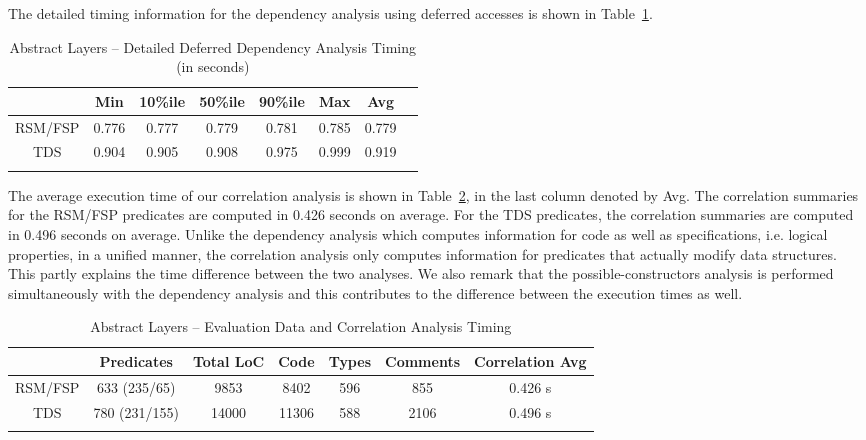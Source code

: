 \documentclass[11pt]{article}
\begin{document}
The detailed timing information for the dependency analysis using deferred accesses
is shown in Table~\ref{res:statsdef2}.

\begin{table}[hbtp]
\caption[Abstract Layers -- Detailed Deferred Dependency Analysis Timing]
{Abstract Layers -- Detailed Deferred Dependency Analysis Timing (in seconds)}
\centering
\begin{tabular}{cccccccc} \toprule
    {}  & {Min} & {10\%ile} & {50\%ile} & {90\%ile} & {Max} & {Avg} \\ \midrule
RSM/FSP & 0.776 & 0.777     & 0.779     & 0.781     & 0.785 & 0.779 \\ \midrule
TDS     & 0.904 & 0.905     & 0.908     & 0.975     & 0.999 & 0.919 \\ \bottomrule\\
\end{tabular}
\label{res:statsdef2}
\end{table}

The average execution time of our correlation
analysis is shown in Table~\ref{res:statscor1}, in the last column denoted by
Avg. The correlation summaries for the RSM/FSP predicates are computed in
0.426 seconds on average. For the TDS predicates, the correlation summaries are
computed in 0.496 seconds on average.
Unlike the dependency analysis which computes information for code as well as
specifications, i.e. logical properties, in a unified manner, the correlation analysis
only computes information for predicates that actually modify data structures.
This partly explains the time difference between the two analyses. We also remark that
the possible-constructors analysis is performed simultaneously with the dependency 
analysis and this contributes to the difference between the execution times as well. 

\begin{table}[hbtp]
\caption{Abstract Layers -- Evaluation Data and Correlation Analysis Timing}
\centering
\begin{tabular}{@{}cc@{\hspace{0.5\tabcolsep}}ccccc@{}} \toprule
    {}      & {Predicates}  & {Total LoC} & {Code} & {Types} & {Comments} & {Correlation Avg}  
                                                                                    \\ \midrule
    RSM/FSP & 633 (235/65)  & 9853        & 8402   & 596     & 855        & 0.426 s \\ \midrule
    TDS     & 780 (231/155) & 14000       & 11306  & 588     & 2106       & 0.496 s \\ \bottomrule\\
\end{tabular}
\label{res:statscor1}
\end{table}
\end{document}
